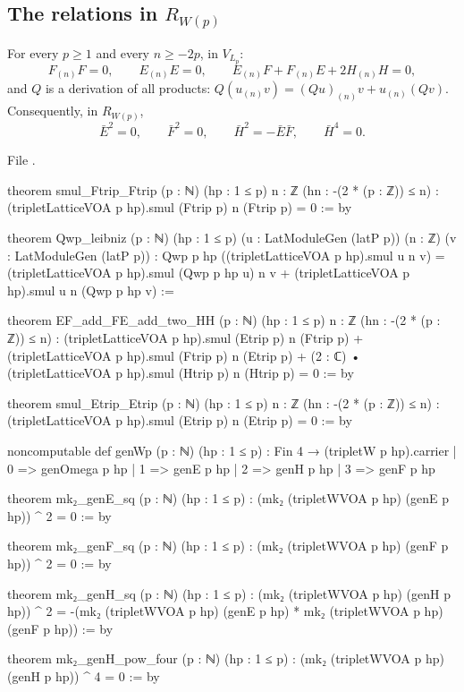 \subsection{The relations in \texorpdfstring{$R_{W(p)}$}{R\_W(p)}}

\begin{theorem}\label{l18:thm:AMrel}
For every $p\ge1$ and every $n\ge-2p$, in $V_{L_p}$:
\begin{equation*}
F_{(n)}F=0,\qquad E_{(n)}E=0,\qquad E_{(n)}F+F_{(n)}E+2H_{(n)}H=0,
\end{equation*}
and $Q$ is a derivation of all products: $Q(u_{(n)}v)=(Qu)_{(n)}v+u_{(n)}(Qv)$. Consequently, in
$R_{W(p)}$,
\begin{equation*}
\bar E^2=0,\qquad \bar F^2=0,\qquad \bar H^2=-\bar E\bar F,\qquad \bar H^4=0 .
\end{equation*}
\end{theorem}
\noindent File .
\begin{leancode}
theorem smul_Ftrip_Ftrip (p : ℕ) (hp : 1 ≤ p) {n : ℤ} (hn : -(2 * (p : ℤ)) ≤ n) :
    (tripletLatticeVOA p hp).smul (Ftrip p) n (Ftrip p) = 0 := by

theorem Qwp_leibniz (p : ℕ) (hp : 1 ≤ p) (u : LatModuleGen (latP p)) (n : ℤ)
    (v : LatModuleGen (latP p)) :
    Qwp p hp ((tripletLatticeVOA p hp).smul u n v)
      = (tripletLatticeVOA p hp).smul (Qwp p hp u) n v
        + (tripletLatticeVOA p hp).smul u n (Qwp p hp v) :=

theorem EF_add_FE_add_two_HH (p : ℕ) (hp : 1 ≤ p) {n : ℤ} (hn : -(2 * (p : ℤ)) ≤ n) :
    (tripletLatticeVOA p hp).smul (Etrip p) n (Ftrip p)
      + (tripletLatticeVOA p hp).smul (Ftrip p) n (Etrip p)
      + (2 : ℂ) • (tripletLatticeVOA p hp).smul (Htrip p) n (Htrip p) = 0 := by

theorem smul_Etrip_Etrip (p : ℕ) (hp : 1 ≤ p) {n : ℤ} (hn : -(2 * (p : ℤ)) ≤ n) :
    (tripletLatticeVOA p hp).smul (Etrip p) n (Etrip p) = 0 := by
\end{leancode}
\begin{leancode}
noncomputable def genWp (p : ℕ) (hp : 1 ≤ p) : Fin 4 → (tripletW p hp).carrier
  | 0 => genOmega p hp
  | 1 => genE p hp
  | 2 => genH p hp
  | 3 => genF p hp

theorem mk₂_genE_sq (p : ℕ) (hp : 1 ≤ p) :
    (mk₂ (tripletWVOA p hp) (genE p hp)) ^ 2 = 0 := by

theorem mk₂_genF_sq (p : ℕ) (hp : 1 ≤ p) :
    (mk₂ (tripletWVOA p hp) (genF p hp)) ^ 2 = 0 := by

theorem mk₂_genH_sq (p : ℕ) (hp : 1 ≤ p) :
    (mk₂ (tripletWVOA p hp) (genH p hp)) ^ 2
      = -(mk₂ (tripletWVOA p hp) (genE p hp) * mk₂ (tripletWVOA p hp) (genF p hp)) := by

theorem mk₂_genH_pow_four (p : ℕ) (hp : 1 ≤ p) :
    (mk₂ (tripletWVOA p hp) (genH p hp)) ^ 4 = 0 := by
\end{leancode}
